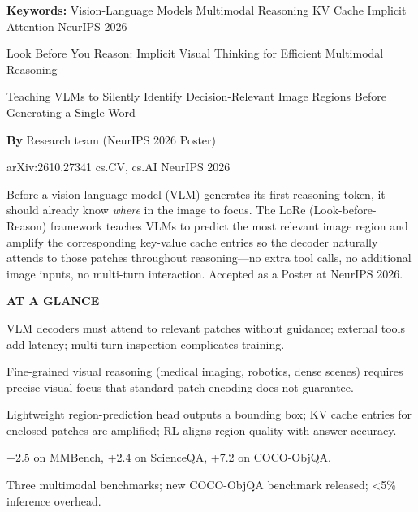 \documentclass[10pt,twocolumn]{article}
\begin{document}
\setlength{\parindent}{0pt}
\setlength{\parskip}{4pt}

{\small\color{keywordgray}\textbf{Keywords:}
  Vision-Language Models \textbullet{} Multimodal Reasoning \textbullet{} KV Cache \textbullet{} Implicit Attention \textbullet{} NeurIPS 2026}\par\vspace{4pt}

{\LARGE\bfseries\raggedright Look Before You Reason: Implicit Visual Thinking for Efficient Multimodal Reasoning}\par\vspace{4pt}
{\large\itshape\raggedright Teaching VLMs to Silently Identify Decision-Relevant Image Regions Before Generating a Single Word}\par\vspace{6pt}
{\small\textbf{By} Research team (NeurIPS 2026 Poster)}\par\vspace{2pt}
{\small\color{keywordgray}arXiv:2610.27341 \textbullet{} cs.CV, cs.AI \textbullet{} NeurIPS 2026}
\par\vspace{2pt}\noindent{\color{rulered}\rule{\columnwidth}{0.6pt}}\vspace{6pt}

Before a vision-language model (VLM) generates its first reasoning token, it should already know \emph{where} in the image to focus.
The LoRe (Look-before-Reason) framework teaches VLMs to predict the most relevant image region and amplify the corresponding key-value cache entries so the decoder naturally attends to those patches throughout reasoning---no extra tool calls, no additional image inputs, no multi-turn interaction.
Accepted as a Poster at NeurIPS 2026.

\begin{mdframed}[backgroundcolor=boxgray,linecolor=rulered,linewidth=1pt,
    innerleftmargin=6pt,innerrightmargin=6pt,
    innertopmargin=6pt,innerbottommargin=6pt]
\textbf{\small AT A GLANCE}\par\vspace{4pt}
\begin{description}[leftmargin=0pt,labelsep=4pt,itemsep=2pt,parsep=0pt,
    font=\small\bfseries]
  \item[Problem:] VLM decoders must attend to relevant patches without guidance; external tools add latency; multi-turn inspection complicates training.
  \item[Why it matters:] Fine-grained visual reasoning (medical imaging, robotics, dense scenes) requires precise visual focus that standard patch encoding does not guarantee.
  \item[Method:] Lightweight region-prediction head outputs a bounding box; KV cache entries for enclosed patches are amplified; RL aligns region quality with answer accuracy.
  \item[Result:] +2.5 on MMBench, +2.4 on ScienceQA, +7.2 on COCO-ObjQA.
  \item[Evidence:] Three multimodal benchmarks; new COCO-ObjQA benchmark released; \textless{}5\% inference overhead.
\end{description}
\end{mdframed}
\end{document}

